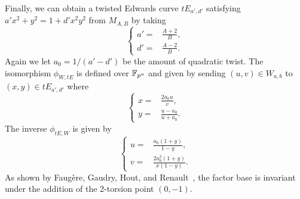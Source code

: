 Finally, we can obtain a twisted Edwards curve $tE_{a',d'}$ satisfying
$a'x^2 + y^2 = 1 + d'x^2y^2$ from $M_{A,B}$ by taking
\[ \left\{\begin{aligned}
a' = & \frac{A + 2}{B}, \\
d' = & \frac{A - 2}{B}.
\end{aligned}\right. \]
%
Again we let $a_0=1/(a' - d')$ be the amount of quadratic twist.
%
The isomorphism $\phi_{W,tE}$ is defined over $\mathbb F_{p^n}$ and given by
sending $(u,v)\in W_{a,b}$ to $(x,y)\in tE_{a',d'}$ where
\[ \left\{\begin{aligned}
x = & \frac{2a_0u}{v}, \\
y = & \frac{u - a_0}{u + a_0}.
\end{aligned}\right. \]
%
The inverse $\phi_{tE,W}$ is given by
\[ \left\{\begin{aligned}
u = & \frac{a_0(1 + y)}{1 - y}, \\
v = & \frac{2a_0^2(1 + y)}{x(1 - y)}.
\end{aligned}\right. \]
%
As shown by Faug\`ere, Gaudry, Hout, and
Renault~\cite{DBLP:journals/joc/FaugereGHR14}, the factor base is
invariant under the addition of the 2-torsion point $(0,-1)$.
